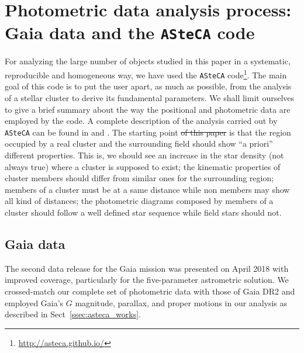 \documentclass[draft]{aa}
\providecommand{\DIFdeltex}[1]{{\protect\color{red}\sout{#1}}}                      %
\providecommand{\DIFdelbegin}{} %
\providecommand{\DIFdelend}{} %
\providecommand{\DIFdel}[1]{\texorpdfstring{\DIFdeltex{#1}}{}} %
\newcommand{\DIFscaledelfig}{0.5}
\newlength{\DIFdelgraphicswidth} %
\newlength{\DIFdelgraphicsheight} %
\newcommand{\DIFdelincludegraphics}[2][]{%
\sbox{\DIFdelgraphicsbox}{\DIFOincludegraphics[#1]{#2}}%
\settoboxwidth{\DIFdelgraphicswidth}{\DIFdelgraphicsbox} %
\settoboxtotalheight{\DIFdelgraphicsheight}{\DIFdelgraphicsbox} %
\scalebox{\DIFscaledelfig}{%
\parbox[b]{\DIFdelgraphicswidth}{\usebox{\DIFdelgraphicsbox}\\[-\baselineskip] \rule{\DIFdelgraphicswidth}{0em}}\llap{\resizebox{\DIFdelgraphicswidth}{\DIFdelgraphicsheight}{%
\setlength{\unitlength}{\DIFdelgraphicswidth}%
\begin{picture}(1,1)%
\thicklines\linethickness{2pt} %
{\color[rgb]{1,0,0}\put(0,0){\framebox(1,1){}}}%
{\color[rgb]{1,0,0}\put(0,0){\line( 1,1){1}}}%
{\color[rgb]{1,0,0}\put(0,1){\line(1,-1){1}}}%
\end{picture}%
}\hspace*{3pt}}} %
} %
\DeclareRobustCommand{\DIFdelbegin}{\DIFOdelbegin \let\includegraphics\DIFdelincludegraphics} %
\DeclareRobustCommand{\DIFdelend}{\DIFOaddend \let\includegraphics\DIFOincludegraphics} %
\begin{document}
\section{Photometric data analysis process: Gaia data and the \texttt{ASteCA}
code}
\label{sec:photom_analysis}

For analyzing the large number of objects studied in this paper in a
systematic, reproducible and homogeneous way, we have used the \texttt{ASteCA}
code\footnote{\url{http://asteca.github.io/}}. The main goal of this code is to
put the user apart, as much as possible, from the analysis of a stellar cluster
to derive its fundamental parameters. We shall limit ourselves to give a brief
summary about the way the positional and photometric data are employed by the
code. A complete description of the analysis carried out by
\texttt{ASteCA} can be found in \cite{Perren_2015} and \cite{Perren_2017}.
The starting point \DIFdelbegin \DIFdel{of this paper }\DIFdelend is that the region occupied by a real cluster
and the surrounding field should show ``a priori'' different properties. This
is, we should see an increase in the star density (not always true) where a
cluster is supposed to exist; the kinematic properties of cluster members
should differ from similar ones for the surrounding region; members of a
cluster must be at a same distance while non members may show all kind of
distances; the photometric diagrams composed by members of a cluster should
follow a well defined star sequence while field stars should not. 



\subsection{Gaia data}
\label{ssec:gaia_data}

The second data release for the Gaia mission \citep{GaiaDR2_2018} was presented
on April 2018 with improved coverage, particularly for the five-parameter
astrometric solution.
We crossed-match our complete set of photometric data with those of Gaia DR2
and employed Gaia's $G$ magnitude, parallax, and proper motions in our
analysis as described in Sect~\ref{ssec:asteca_works}.
\end{document}
